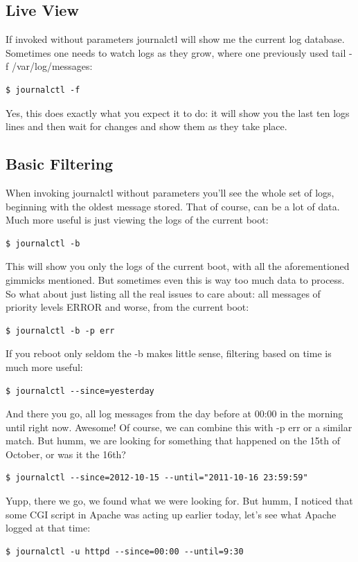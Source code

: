 \documentclass[titlepage]{article}
\begin{document}
\subsection{Live View}
If invoked without parameters journalctl will show me the current log database. Sometimes one needs to watch logs as they grow, where one previously used tail -f /var/log/messages:
\begin{lstlisting}
$ journalctl -f
\end{lstlisting}
Yes, this does exactly what you expect it to do: it will show you the last ten logs lines and then wait for changes and show them as they take place.
\subsection{Basic Filtering}
When invoking journalctl without parameters you'll see the whole set of logs, beginning with the oldest message stored. That of course, can be a lot of data. Much more useful is just viewing the logs of the current boot:
\begin{lstlisting}
$ journalctl -b
\end{lstlisting}
This will show you only the logs of the current boot, with all the aforementioned gimmicks mentioned. But sometimes even this is way too much data to process. So what about just listing all the real issues to care about: all messages of priority levels ERROR and worse, from the current boot:
\begin{lstlisting}
$ journalctl -b -p err
\end{lstlisting}
If you reboot only seldom the -b makes little sense, filtering based on time is much more useful:
\begin{lstlisting}
$ journalctl --since=yesterday
\end{lstlisting}
And there you go, all log messages from the day before at 00:00 in the morning until right now. Awesome! Of course, we can combine this with -p err or a similar match. But humm, we are looking for something that happened on the 15th of October, or was it the 16th?
\begin{lstlisting}
$ journalctl --since=2012-10-15 --until="2011-10-16 23:59:59"
\end{lstlisting}
Yupp, there we go, we found what we were looking for. But humm, I noticed that some CGI script in Apache was acting up earlier today, let's see what Apache logged at that time:
\begin{lstlisting}
$ journalctl -u httpd --since=00:00 --until=9:30
\end{lstlisting}
\end{document}
